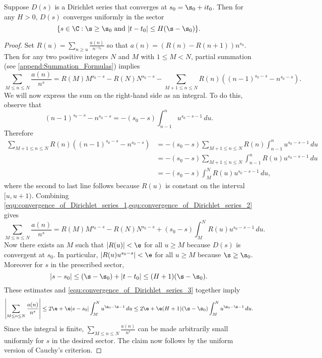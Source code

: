     \begin{theorem}\label{thm:convergence_of_Dirichlet_series}
      Suppose $D(s)$ is a Dirichlet series that converges at $s_{0} = \s_{0}+it_{0}$. Then for any $H > 0$, $D(s)$ converges uniformly in the sector
      \[
        \{s \in \C:\text{$\s \ge \s_{0}$ and $|t-t_{0}| \le H(\s-\s_{0})$}\}.
      \]
    \end{theorem}
    \begin{proof}
      Set $R(u) = \sum_{n \ge u}\frac{a(n)}{n^{-s_{0}}}$ so that $a(n) = (R(n)-R(n+1))n^{s_{0}}$. Then for any two positive integers $N$ and $M$ with $1 \le M < N$, partial summation (see \cref{append:Summation_Formulas}) implies
      \begin{equation}\label{equ:convergence_of_Dirichlet_series_1}
        \sum_{M \le n \le N}\frac{a(n)}{n^{s}} = R(M)M^{s_{0}-s}-R(N)N^{s_{0}-s}-\sum_{M+1 \le n \le N}R(n)((n-1)^{s_{0}-s}-n^{s_{0}-s}).
      \end{equation}
      We will now express the sum on the right-hand side as an integral. To do this, observe that
      \[
        (n-1)^{s_{0}-s}-n^{s_{0}-s} = -(s_{0}-s)\int_{n-1}^{n}u^{s_{0}-s-1}\,du.
      \]
      Therefore
      \begin{equation}\label{equ:convergence_of_Dirichlet_series_2}
        \begin{aligned}
          \sum_{M+1 \le n \le N}R(n)((n-1)^{s_{0}-s}-n^{s_{0}-s}) &= -(s_{0}-s)\sum_{M+1 \le n \le N}R(n)\int_{n-1}^{n}u^{s_{0}-s-1}\,du \\
          &= -(s_{0}-s)\sum_{M+1 \le n \le N}\int_{n-1}^{n}R(u)u^{s_{0}-s-1}\,du \\
          &= -(s_{0}-s)\int_{M}^{N}R(u)u^{s_{0}-s-1}\,du,
        \end{aligned}
      \end{equation}
      where the second to last line follows because $R(u)$ is constant on the interval $[u,u+1)$. Combining \cref{equ:convergence_of_Dirichlet_series_1,equ:convergence_of_Dirichlet_series_2} gives
      \begin{equation}\label{equ:convergence_of_Dirichlet_series_3}
        \sum_{M \le n \le N}\frac{a(n)}{n^{s}} = R(M)M^{s_{0}-s}-R(N)N^{s_{0}-s}+(s_{0}-s)\int_{M}^{N}R(u)u^{s_{0}-s-1}\,du.
      \end{equation}
      Now there exists an $M$ such that $|R(u)| < \e$ for all $u \ge M$ because $D(s)$ is convergent at $s_{0}$. In particular, $|R(u)u^{s_{0}-s}| < \e$ for all $u \ge M$ because $\s \ge \s_{0}$. Moreover for $s$ in the prescribed sector,
      \[
        |s-s_{0}| \le (\s-\s_{0})+|t-t_{0}| \le (H+1)(\s-\s_{0}).
      \]
      These estimates and \cref{equ:convergence_of_Dirichlet_series_3} together imply
      \[
        \left|\sum_{M \le n \le N}\frac{a(n)}{n^{s}}\right| \le 2\e+\e|s-s_{0}|\int_{M}^{N}u^{\s_{0}-\s-1}\,du \le 2\e+\e(H+1)(\s-\s_{0})\int_{M}^{N}u^{\s_{0}-\s-1}\,du.
      \]
      Since the integral is finite, $\sum_{M \le n \le N}\frac{a(n)}{n^{s}}$ can be made arbitrarily small uniformly for $s$ in the desired sector. The claim now follows by the uniform version of Cauchy's criterion.
    \end{proof}
    
